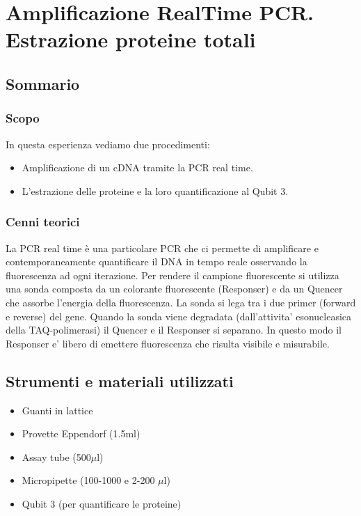 \section{\LARGE{Amplificazione RealTime PCR. Estrazione proteine totali}}

\vspace{0.6cm}

\subsection{Sommario}

\subsubsection{Scopo}

In questa esperienza vediamo due procedimenti:
\begin{itemize}
  \item Amplificazione di un cDNA tramite la PCR real time.
  \item L'estrazione delle proteine e la loro quantificazione al Qubit 3.
\end{itemize}

\subsubsection{Cenni teorici}

La PCR real time è una particolare PCR che ci permette di amplificare e
contemporaneamente quantificare il DNA in tempo reale osservando la fluorescenza
ad ogni iterazione.
Per rendere il campione fluorescente si utilizza una sonda composta da un colorante
fluorescente (Responser) e da un Quencer che assorbe l'energia della fluorescenza.
La sonda si lega tra i due primer (forward e reverse) del gene.
Quando la sonda viene degradata (dall'attivita' esonucleasica della TAQ-polimerasi)
il Quencer e il Responser si separano. In questo modo il Responser e' libero di emettere
fluorescenza che risulta visibile e misurabile.

\subsection{Strumenti e materiali utilizzati}

\begin{itemize}
\item Guanti in lattice
\item Provette Eppendorf (1.5ml)
\item Assay tube (500$\mu$l)
\item Micropipette (100-1000  e 2-200 $\mu$l)
\item Qubit 3 (per quantificare le proteine)
\end{itemize}

